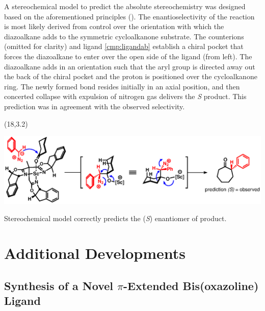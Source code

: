 A stereochemical model to predict the absolute stereochemistry was designed based on the
aforementioned principles (). The enantioselectivity of the reaction
is most likely derived from control over the orientation with which the diazoalkane adds to
the symmetric cycloalkanone substrate. The counterions (omitted for clarity) and ligand
\ref{cmp:ligandab} establish a chiral pocket that forces the diazoalkane to enter over the open side of the ligand (from left).
The diazoalkane adds in an orientation such that the aryl group is directed away out the back of
the chiral pocket and the proton is positioned over the cycloalkanone ring. The newly formed
 bond resides initially in an axial position, and then concerted collapse with expulsion of nitrogen gas delivers the \textit{S} product. This prediction was in agreement with the observed selectivity.
 \begin{Scheme}[h]
  \centering
   \begin{textblock}{1}(18,3.2)  \end{textblock}
  \includegraphics[scale=0.8]{chp_asymmetric/images/stereochemicalmodel}
  \caption{Stereochemical model correctly predicts the (\textit{S}) enantiomer of product.}
  \label{sch:stereochemicalmodel}
\end{Scheme}
 
\pagebreak
\section{Additional Developments}
\subsection{Synthesis of a Novel $\pi$-Extended Bis(oxazoline) Ligand}

